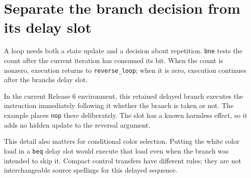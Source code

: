 \section{Separate the branch decision from its delay
  slot}\label{003-eight-byte-sprite-p06-separate-the-branch-decision-from-its-delay-slot}

A loop needs both a state update and a decision about repetition.
\texttt{bne} tests the count after the current iteration has consumed
its bit. When the count is nonzero, execution returns to
\texttt{reverse\_loop}; when it is zero, execution continues after the
branch\textquotesingle s delay slot.

In the current Release 6 environment, this retained delayed branch
executes the instruction immediately following it whether the branch is
taken or not. The example places \texttt{nop} there deliberately. The
slot has a known harmless effect, so it adds no hidden update to the
reversal argument.

This detail also matters for conditional color selection. Putting the
white color load in a \texttt{beq} delay slot would execute that load
even when the branch was intended to skip it. Compact control transfers
have different rules; they are not interchangeable source spellings for
this delayed sequence.
